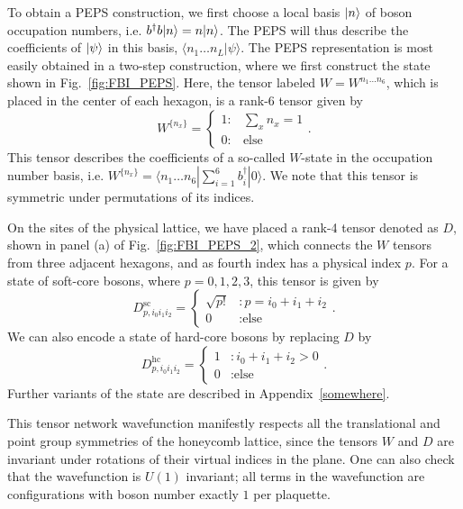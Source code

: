 To obtain a PEPS construction, we first choose a local basis $\vert n \rangle$ of boson occupation numbers, i.e. $b^\dagger b \vert n \rangle = n \vert n \rangle$. The
PEPS will thus describe the coefficients of $\vert \psi \rangle$ in this basis, $\langle n_1 \ldots n_L | \psi \rangle$.
The PEPS representation is most easily obtained in a two-step construction, where we first construct the state shown in Fig.~\ref{fig:FBI_PEPS}.
Here, the tensor labeled $W=W^{n_1 \ldots n_6}$, which is placed in the center of each hexagon, is a rank-6 tensor given by
\begin{equation}
W^{\{n_x\}}  = \left\{ \begin{array}{lr}
													1  : & \sum\limits_x n_x = 1 \\
													0  : & \text{else}
													\end{array} \right. .
\end{equation}
This tensor describes the coefficients of a so-called $W$-state in the occupation number basis, i.e. $W^{\lbrace n_x\rbrace }= \langle n_1 \ldots n_6 | \sum_{i=1}^6 b_i^\dagger |0\rangle$. We note that this tensor is symmetric under permutations of its indices.

On the sites of the physical lattice, we have placed a rank-4 tensor denoted as $D$, shown in panel (a) of Fig.~\ref{fig:FBI_PEPS_2},
which connects the $W$ tensors from three adjacent hexagons,
and as fourth index has a physical index $p$. For a state of soft-core bosons, where $p=0,1,2,3$, this tensor is given by
\begin{equation} \label{eqn:D}
D^\mathrm{sc}_{p, i_0 i_1 i_2}  = \left\{ \begin{array}{ll}
													\sqrt{p!}  &: p =i_0+i_1+i_2  \\
													0  &:  \text{else}
													\end{array}
											\right. .
\end{equation}
We can also encode a state of hard-core bosons by replacing $D$ by
\begin{equation}
D^\mathrm{hc}_{p, i_0 i_1 i_2}  = \left\{ \begin{array}{ll}
													1  &: i_0+i_1+i_2 > 0  \\
													0  &:  \text{else}
													\end{array}
											\right. .
\end{equation}
Further variants of the state are described in Appendix~\ref{somewhere}.

This tensor network wavefunction manifestly respects all the translational and point group symmetries of the honeycomb lattice,
since the tensors $W$ and $D$ are invariant under rotations of their virtual indices in the plane. One can also check that the
wavefunction is $U(1)$ invariant; all terms in the wavefunction are configurations with boson number exactly $1$ per plaquette.

